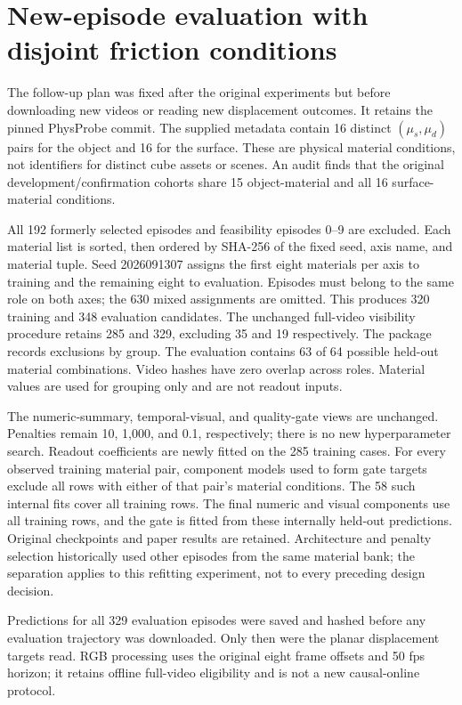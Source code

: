 \section{New-episode evaluation with disjoint friction conditions}
The follow-up plan was fixed after the original experiments but before downloading new videos or reading new displacement outcomes. It retains the pinned PhysProbe commit. The supplied metadata contain 16 distinct $(\mu_s,\mu_d)$ pairs for the object and 16 for the surface. These are physical material conditions, not identifiers for distinct cube assets or scenes. An audit finds that the original development/confirmation cohorts share 15 object-material and all 16 surface-material conditions.

All 192 formerly selected episodes and feasibility episodes 0--9 are excluded. Each material list is sorted, then ordered by SHA-256 of the fixed seed, axis name, and material tuple. Seed 2026091307 assigns the first eight materials per axis to training and the remaining eight to evaluation. Episodes must belong to the same role on both axes; the 630 mixed assignments are omitted. This produces 320 training and 348 evaluation candidates. The unchanged full-video visibility procedure retains 285 and 329, excluding 35 and 19 respectively. The package records exclusions by group. The evaluation contains 63 of 64 possible held-out material combinations. Video hashes have zero overlap across roles. Material values are used for grouping only and are not readout inputs.

The numeric-summary, temporal-visual, and quality-gate views are unchanged. Penalties remain 10, 1,000, and 0.1, respectively; there is no new hyperparameter search. Readout coefficients are newly fitted on the 285 training cases. For every observed training material pair, component models used to form gate targets exclude all rows with either of that pair's material conditions. The 58 such internal fits cover all training rows. The final numeric and visual components use all training rows, and the gate is fitted from these internally held-out predictions. Original checkpoints and paper results are retained. Architecture and penalty selection historically used other episodes from the same material bank; the separation applies to this refitting experiment, not to every preceding design decision.

Predictions for all 329 evaluation episodes were saved and hashed before any evaluation trajectory was downloaded. Only then were the planar displacement targets read. RGB processing uses the original eight frame offsets and 50 fps horizon; it retains offline full-video eligibility and is not a new causal-online protocol.

